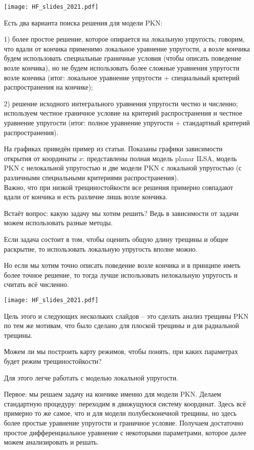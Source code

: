 \documentclass[main.tex]{subfiles}
\begin{document}
\texttt{[image: HF\_slides\_2021.pdf]}

Есть два варианта поиска решения для модели PKN:

1) более простое решение, которое опирается на локальную упругость;
говорим, что вдали от кончика применимо локальное уравнение упругости, а возле кончика будем использовать специальные граничные условия (чтобы описать поведение возле кончика), но не будем использовать более сложные уравнения упругости возле кончика (итог: локальное уравнение упругости + специальный критерий распространения на кончике);

2) решение исходного интегрального уравнения упругости честно и численно;
используем честное граничное условие на критерий распространения и честное уравнение упругости (итог: полное уравнение упругости + стандартный критерий распространения).

На графиках приведён пример из статьи.
Показаны графики зависимости открытия от координаты $x$: представлены полная модель planar ILSA, модель PKN с нелокальной упругостью и две модели PKN с локальной упругостью (с различными специальными критериями распространения).
\\

Важно, что при низкой трещиностойкости все решения примерно совпадают вдали от кончика и есть различие лишь возле кончика.

Встаёт вопрос: какую задачу мы хотим решить?
Ведь в зависимости от задачи можем использовать разные методы.

Если задача состоит в том, чтобы оценить общую длину трещины и общее раскрытие, то использовать локальную упругость вполне можно.

Но если мы хотим точно описать поведение возле кончика и в принципе иметь более точное решение, то тогда лучше использовать нелокальную упругость и считать всё численно.

\texttt{[image: HF\_slides\_2021.pdf]}

Цель этого и следующих нескольких слайдов -- это сделать анализ трещины PKN по тем же мотивам, что было сделано для плоской трещины и для радиальной трещины.

Можем ли мы построить карту режимов, чтобы понять, при каких параметрах будет режим трещиностойкости?

Для этого легче работать с моделью локальной упругости.

Первое: мы решаем задачу на кончике именно для модели PKN.
Делаем стандартную процедуру: переходим в движущуюся систему координат.
Здесь всё примерно то же самое, что и для модели полубесконечной трещины, но здесь более простые уравнение упругости и граничное условие.
Получаем достаточно простое дифференциальное уравнение с некоторыми параметрами, которое далее можем анализировать и решать.
\end{document}
